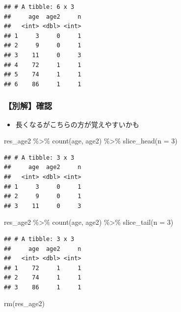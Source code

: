 \documentclass[
  xelatex,ja=standard, b5paper]{bxjsbook}
\newenvironment{Shaded}{\begin{snugshade}}{\end{snugshade}}
\newcommand{\AttributeTok}[1]{\textcolor[rgb]{0.77,0.63,0.00}{#1}}
\newcommand{\DecValTok}[1]{\textcolor[rgb]{0.00,0.00,0.81}{#1}}
\newcommand{\FunctionTok}[1]{\textcolor[rgb]{0.00,0.00,0.00}{#1}}
\newcommand{\NormalTok}[1]{#1}
\newcommand{\SpecialCharTok}[1]{\textcolor[rgb]{0.00,0.00,0.00}{#1}}
\providecommand{\tightlist}{%
  \setlength{\itemsep}{0pt}\setlength{\parskip}{0pt}}
\begin{document}
\begin{verbatim}
## # A tibble: 6 x 3
##     age  age2     n
##   <int> <dbl> <int>
## 1     3     0     1
## 2     9     0     1
## 3    11     0     3
## 4    72     1     1
## 5    74     1     1
## 6    86     1     1
\end{verbatim}

\hypertarget{ux5225ux89e3ux78baux8a8d}{%
\subsubsection{【別解】確認}\label{ux5225ux89e3ux78baux8a8d}}

\begin{itemize}
\tightlist
\item
  長くなるがこちらの方が覚えやすいかも
\end{itemize}

\begin{Shaded}
\begin{Highlighting}[]
\NormalTok{res\_age2 }\SpecialCharTok{\%\textgreater{}\%} 
  \FunctionTok{count}\NormalTok{(age, age2) }\SpecialCharTok{\%\textgreater{}\%} 
  \FunctionTok{slice\_head}\NormalTok{(}\AttributeTok{n =} \DecValTok{3}\NormalTok{)}
\end{Highlighting}
\end{Shaded}

\begin{verbatim}
## # A tibble: 3 x 3
##     age  age2     n
##   <int> <dbl> <int>
## 1     3     0     1
## 2     9     0     1
## 3    11     0     3
\end{verbatim}

\begin{Shaded}
\begin{Highlighting}[]
\NormalTok{res\_age2 }\SpecialCharTok{\%\textgreater{}\%} 
  \FunctionTok{count}\NormalTok{(age, age2) }\SpecialCharTok{\%\textgreater{}\%} 
  \FunctionTok{slice\_tail}\NormalTok{(}\AttributeTok{n =} \DecValTok{3}\NormalTok{)}
\end{Highlighting}
\end{Shaded}

\begin{verbatim}
## # A tibble: 3 x 3
##     age  age2     n
##   <int> <dbl> <int>
## 1    72     1     1
## 2    74     1     1
## 3    86     1     1
\end{verbatim}

\begin{Shaded}
\begin{Highlighting}[]
\FunctionTok{rm}\NormalTok{(res\_age2)}
\end{Highlighting}
\end{Shaded}
\end{document}
